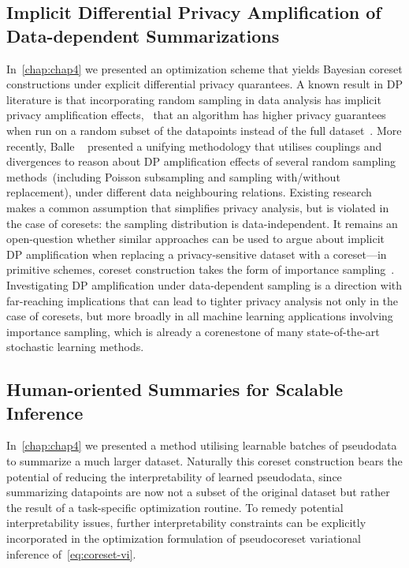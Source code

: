 \subsection{Implicit Differential Privacy Amplification of Data-dependent Summarizations}
\label{subsec:implicit-dp-amplification}

In~\cref{chap:chap4} we presented an optimization scheme that yields Bayesian coreset constructions under explicit differential privacy quarantees. A known result in DP literature is that incorporating random sampling in data analysis has implicit privacy amplification effects, \ie~that an algorithm has higher privacy guarantees when run on a random subset of the datapoints instead of the full dataset~\citep{li12, beimel13, bassily14, abadi16}. More recently, Balle \etal~\citep{balle18} presented a unifying methodology that utilises couplings and divergences to reason about DP amplification effects of several random sampling methods~(including Poisson subsampling and sampling with/without replacement), under different data neighbouring relations. Existing research makes a common assumption that simplifies privacy analysis, but is violated in the case of coresets: the sampling distribution is data-independent. It remains an open-question whether similar approaches can be used to argue about implicit DP amplification when replacing a privacy-sensitive dataset with a coreset---in primitive schemes, coreset construction takes the form of importance sampling~\citep{bachem17}. Investigating DP amplification under data-dependent sampling is a direction with far-reaching implications that can lead to tighter privacy analysis not only in the case of coresets, but more broadly in all machine learning applications involving importance sampling, which is already a corenestone of many state-of-the-art stochastic learning methods. 


\subsection{Human-oriented Summaries for Scalable Inference}
\label{subsec:human-oriented-pseudodata}

In~\cref{chap:chap4} we presented a method utilising learnable batches of pseudodata to summarize a much larger dataset. Naturally this coreset construction bears the potential of reducing the interpretability of learned pseudodata, since summarizing datapoints are now not a subset of the original dataset but rather the result of a task-specific optimization routine. To remedy potential interpretability issues, further interpretability constraints can be explicitly incorporated in the optimization formulation of pseudocoreset variational inference of~\cref{eq:coreset-vi}.

